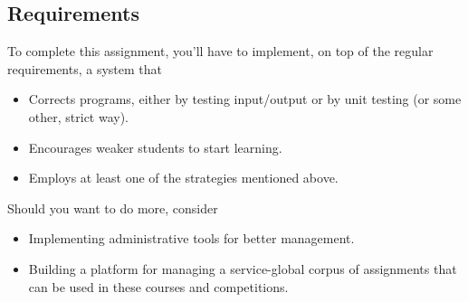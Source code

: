 \begin{refsection}
\subsection{Requirements}
To complete this assignment, you'll have to implement, on top of the regular requirements, a system that
\begin{itemize}
    \item Corrects programs, either by testing input/output or by unit testing (or some other, strict way).
    \item Encourages weaker students to start learning.
    \item Employs at least one of the strategies mentioned above.
\end{itemize}
Should you want to do more, consider
    \begin{itemize}
        \item Implementing administrative tools for better management.
        \item Building a platform for managing a service-global corpus of assignments that can be used in these courses and competitions.
    \end{itemize}
\end{refsection}
